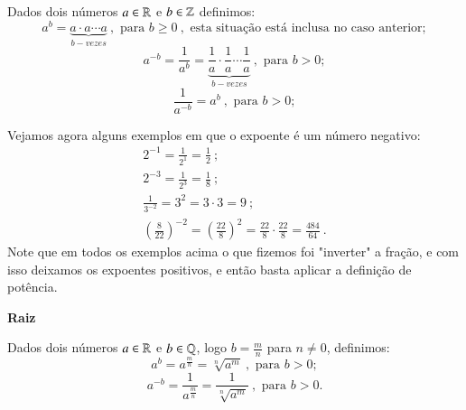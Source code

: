  \vskip0.3cm

 \colorbox{azul}{
 \begin{minipage}{0.9\linewidth}
 \begin{center}
   Dados dois números $a \in \mathbb{R}$ e $b \in \mathbb{Z}$ definimos:
 \[a^b= \underbrace{a \cdot a \cdots a}_{b - vezes} \ , \text{ para } b\geq0 \ , \text{ esta situação está inclusa no caso anterior};\]
 \[a^{-b}= \frac{1}{a^b}= \underbrace{\frac{1}{a} \cdot \frac{1}{a} \cdots \frac{1}{a}}_{b - vezes} \ , \text{ para } b>0 ;\]
 \[\frac{1}{a^{-b}}= a^b \ , \text{ para } b>0;\]
 \end{center}
 \end{minipage}}

 \vskip0.3cm

 \begin{exem}
 Vejamos agora alguns exemplos em que o expoente é um número negativo:
 \begin{eqnarray*}
  2^{-1}= \frac{1}{2^{1}}= \frac{1}{2} \ ; \\
  2^{-3}= \frac{1}{2^3}= \frac{1}{8} \ ; \\
  \frac{1}{3^{-2}}= 3^2= 3 \cdot 3= 9 \ ; \\
  \left( \frac{8}{22} \right)^{-2}= \left( \frac{22}{8} \right)^{2}= \frac{22}{8} \cdot \frac{22}{8}= \frac{484}{64} \ .
 \end{eqnarray*}
 Note que em todos os exemplos acima o que fizemos foi "inverter" a fração, e com isso deixamos os expoentes positivos, e então basta aplicar a definição de potência.

 \end{exem}

 \vskip0.3cm

 \textbf{Raiz}

 \vskip0.3cm

 \colorbox{azul}{
 \begin{minipage}{0.9\linewidth}
 \begin{center}
  Dados dois números $a \in \mathbb{R}$ e $b \in \mathbb{Q}$, logo $b= \frac{m}{n}$ para $n \neq 0$, definimos:
 \[a^b= a^{\frac{m}{n}}= \sqrt[n]{a^m} \ , \text{ para } b>0 ;\]
 \[a^{-b}= \frac{1}{a^{\frac{m}{n}}}= \frac{1}{\sqrt[n]{a^m}} \ ,  \text{ para } b>0.\]
 \end{center}
 \end{minipage}}

 \vskip0.3cm

